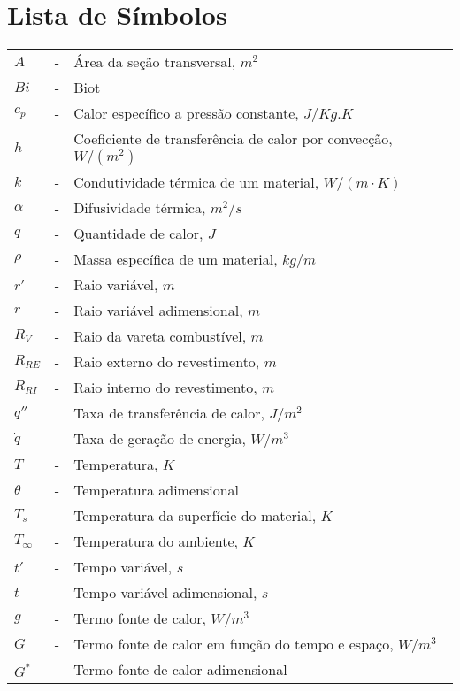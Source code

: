 \chapter*{Lista de Símbolos}


\begin{table}[H]
\begin{tabular}{lcl}
\(A\) & - & Área da seção transversal, \(m^2\) \\
\(Bi\) & - & Biot \\
\(c_p\) & - & Calor específico a pressão constante, \(J/Kg. K\) \\
\(h\) & - & Coeficiente de transferência de calor por convecção, \( W / (m^2) \) \\
\(k\) & - & Condutividade térmica de um material, \( W / ( m \cdot K ) \) \\
\(\alpha\) & - & Difusividade térmica, \( m^2 / s \) \\
\(q\) & - & Quantidade de calor, \(J\) \\
\(\rho\) & - & Massa específica de um material, \( kg / m \) \\
\(r '\) & - & Raio variável, \( m \) \\
\(r\) & - & Raio variável adimensional, \( m \) \\
\(R_{V}\) & - & Raio da vareta combustível, \( m \) \\
\(R_{RE}\) & - & Raio externo do revestimento, \( m \) \\
\(R_{RI}\) & - & Raio interno do revestimento, \( m \) \\
\(q''\) &  & Taxa de transferência de calor, \(J/m^2\) \\
\( \dot{q} \) & - & Taxa de geração de energia, \( W / m^3 \) \\
\(T\) & - & Temperatura, \( K \) \\
\(\theta\) & - & Temperatura adimensional \\
\(T_s\) & - & Temperatura da superfície do material, \(K\) \\
\(T _\infty \) & - & Temperatura do ambiente, \(K\) \\
\(t '\) & - & Tempo variável, \( s \) \\
\(t\) & - & Tempo variável adimensional, \( s \) \\
\(g\) & - & Termo fonte de calor, \( W / m^3 \) \\
\(G\) & - & Termo fonte de calor em função do tempo e espaço, \( W / m^3 \) \\
\(G^*\) & - & Termo fonte de calor adimensional
\end{tabular}
\end{table}
